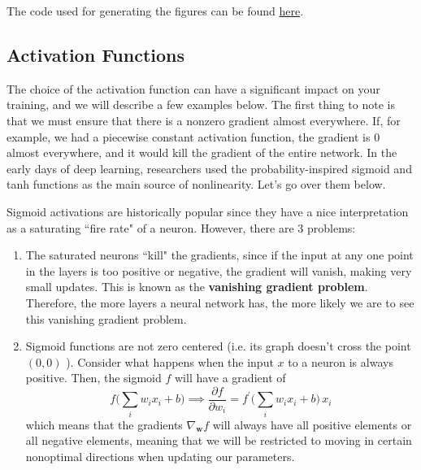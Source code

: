     \begin{code} 
      The code used for generating the figures can be found \href{code/01_MLP/initialization.ipynb}{here}. 
    \end{code}
    
  \subsection{Activation Functions} 

    The choice of the activation function can have a significant impact on your training, and we will describe a few examples below. The first thing to note is that we must ensure that there is a nonzero gradient almost everywhere. If, for example, we had a piecewise constant activation function, the gradient is $0$ almost everywhere, and it would kill the gradient of the entire network. In the early days of deep learning, researchers used the probability-inspired sigmoid and tanh functions as the main source of nonlinearity. Let's go over them below. 

    \begin{definition}[Sigmoid]
      Sigmoid activations are historically popular since they have a nice interpretation as a saturating ``fire rate" of a neuron. However, there are 3 problems: 
      \begin{enumerate}
        \item The saturated neurons ``kill" the gradients, since if the input at any one point in the layers is too positive or negative, the gradient will vanish, making very small updates. This is known as the \textbf{vanishing gradient problem}. Therefore, the more layers a neural network has, the more likely we are to see this vanishing gradient problem. 
        \item Sigmoid functions are not zero centered (i.e. its graph doesn't cross the point $(0, 0)$ ). Consider what happens when the input $x$ to a neuron is always positive. Then, the sigmoid $f$ will have a gradient of 
        \begin{equation}
          f \bigg( \sum_i w_i x_i + b \bigg) \implies \frac{\partial f}{\partial w_i} = f^\prime \bigg( \sum_i w_i x_i + b \bigg)\, x_i
        \end{equation}
        which means that the gradients $\nabla_\mathbf{w} f$ will always have all positive elements or all negative elements, meaning that we will be restricted to moving in certain nonoptimal directions when updating our parameters. 
      \end{enumerate}
    \end{definition} 

